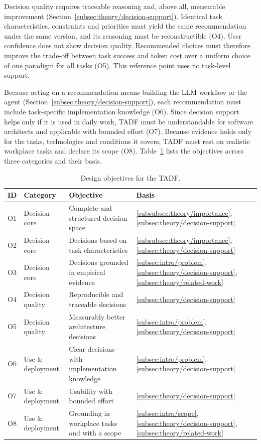 Decision quality requires traceable reasoning and, above all, measurable improvement (Section~\ref{subsec:theory/decision-support}). Identical task characteristics, constraints and priorities must yield the same recommendation under the same version, and its reasoning must be reconstructible (O4). User confidence does not show decision quality. Recommended choices must therefore improve the trade-off between task success and token cost over a uniform choice of one paradigm for all tasks (O5). This reference point uses no task-level support.

Because acting on a recommendation means building the LLM workflow or the agent (Section~\ref{subsec:theory/decision-support}), each recommendation must include task-specific implementation knowledge (O6). Since decision support helps only if it is used in daily work, TADF must be understandable for software architects and applicable with bounded effort (O7). Because evidence holds only for the tasks, technologies and conditions it covers, TADF must rest on realistic workplace tasks and declare its scope (O8). Table~\ref{tab:design-objectives} lists the objectives across three categories and their basis.

\begin{table}[htbp]
  \centering
  \caption{Design objectives for the TADF.}
  \label{tab:design-objectives}
  \small
  \begin{tabular}{@{}l l >{\raggedright\arraybackslash}p{7.5cm} l@{}}
    \toprule
    \textbf{ID} & \textbf{Category} & \textbf{Objective} & \textbf{Basis} \\
    \midrule
    O1 & Decision core & Complete and structured decision space & \ref{subsubsec:theory/importance}, \ref{subsec:theory/decision-support} \\
    O2 & Decision core & Decisions based on task characteristics & \ref{subsubsec:theory/importance}, \ref{subsec:theory/decision-support} \\
    O3 & Decision core & Decisions grounded in empirical evidence & \ref{subsec:intro/problem}, \ref{subsec:theory/decision-support}, \ref{subsec:theory/related-work} \\
    O4 & Decision quality & Reproducible and traceable decisions & \ref{subsec:theory/decision-support} \\
    O5 & Decision quality & Measurably better architecture decisions & \ref{subsec:intro/problem}, \ref{subsec:theory/decision-support} \\
    O6 & Use \& deployment & Clear decisions with implementation knowledge & \ref{subsec:intro/problem}, \ref{subsec:theory/decision-support} \\
    O7 & Use \& deployment & Usability with bounded effort & \ref{subsec:theory/decision-support} \\
    O8 & Use \& deployment & Grounding in workplace tasks and with a scope & \ref{subsec:intro/scope}, \ref{subsec:theory/decision-support}, \ref{subsec:theory/related-work} \\
    \bottomrule
  \end{tabular}
\end{table}

